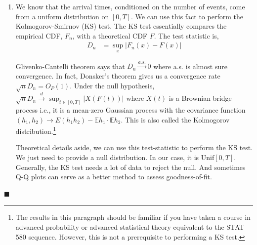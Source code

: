 \documentclass[11pt]{article}
\newcommand{\E}{\mathbb{E}}
\newcommand{\abs}[1]{\left\lvert#1\right\rvert}
\begin{document}
\begin{enumerate}
\begin{enumerate}
\item We know that the arrival times, conditioned on the number of events, come from a uniform distribution on $[0, T]$. We can use this fact to perform the Kolmogorov-Smirnov (KS) test. The KS test essentially compares the empirical CDF, $F_n$, with a theoretical CDF $F$. The test statistic is,
\begin{align*}
	D_n &= \sup_x \abs{F_n(x) - F(x)}
\end{align*}

Glivenko-Cantelli theorem says that $D_n \stackrel{a.s.}{\to} 0$ where a.s. is almost sure convergence. In fact, Donsker's theorem gives us a convergence rate $\sqrt{n} D_n = O_P(1)$. Under the null hypothesis, $\sqrt{n} D_n \stackrel{d}{\to} \sup_{t \in [0,T]} \abs{X(F(t))}$ where $X(t)$ is a Brownian bridge process i.e., it is a mean-zero Gaussian process with the covariance function $(h_1, h_2) \to E (h_1 h_2) - \E h_1 \cdot \E h_2$. This is also called the Kolmogorov distribution.\footnote{The results in this paragraph should be familiar if you have taken a course in advanced probability or advanced statistical theory equivalent to the STAT 580 sequence. However, this is not a prerequisite to performing a KS test.}

Theoretical details aside, we can use this test-statistic to perform the KS test. We just need to provide a null distribution. In our case, it is $\text{Unif}[0, T]$. Generally, the KS test needs a lot of data to reject the null. And sometimes Q-Q plots can serve as a better method to assess goodness-of-fit.

\end{enumerate}

\hfill $\blacksquare$



\end{enumerate}
\end{document}
